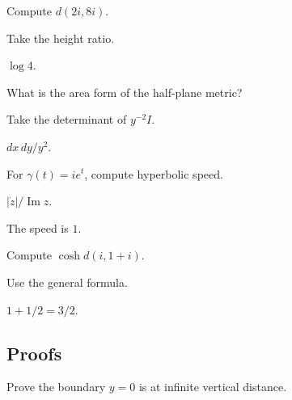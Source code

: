 \begin{exercise}\label{exr:vii32-ped-02}
Compute \(d(2i,8i)\).
\end{exercise}

\begin{hint}
Take the height ratio.
\end{hint}

\begin{solution}
\(\log4\).
\end{solution}

\begin{exercise}\label{exr:vii32-ped-03}
What is the area form of the half-plane metric?
\end{exercise}

\begin{hint}
Take the determinant of \(y^{-2}I\).
\end{hint}

\begin{solution}
\(dx\,dy/y^2\).
\end{solution}

\begin{exercise}\label{exr:vii32-ped-04}
For \(\gamma(t)=i e^t\), compute hyperbolic speed.
\end{exercise}

\begin{hint}
\(|\dot z|/\operatorname{Im}z\).
\end{hint}

\begin{solution}
The speed is \(1\).
\end{solution}

\begin{exercise}\label{exr:vii32-ped-05}
Compute \(\cosh d(i,1+i)\).
\end{exercise}

\begin{hint}
Use the general formula.
\end{hint}

\begin{solution}
\(1+1/2=3/2\).
\end{solution}

\subsection*{Proofs}

\begin{exercise}\label{exr:vii32-ped-06}
Prove the boundary \(y=0\) is at infinite vertical distance.
\end{exercise}

